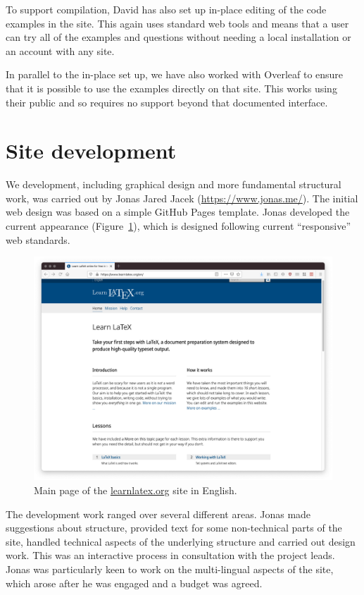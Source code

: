 \documentclass[a4paper]{article}
\begin{document}
To support compilation, David has also set up in-place editing of the code
examples in the site. This again uses standard web tools and means that a user
can try all of the examples and questions without needing a local installation
or an account with any site.

In parallel to the in-place set up, we have also worked with Overleaf to ensure
that it is possible to use the examples directly on that site. This works using
their public  and so requires no support beyond that documented
interface.

\section{Site development}

We development, including graphical design and more fundamental structural
work, was carried out by Jonas Jared Jacek (\url{https://www.jonas.me/}). The
initial web design was based on a simple GitHub Pages template. Jonas developed
the current appearance (Figure~\ref{fgr:site}), which is designed following
current \enquote{responsive} web standards.
\begin{figure}
  \includegraphics[width = \textwidth]{learnlatex-screenshot}
  \caption{Main page of the \url{learnlatex.org} site in English.\label{fgr:site}}
\end{figure}

The development work ranged over several different areas. Jonas made
suggestions about structure, provided text for some non-technical parts of the
site, handled technical aspects of the underlying structure and carried out
design work. This was an interactive process in consultation with the project
leads. Jonas was particularly keen to work on the multi-lingual aspects of
the site, which arose after he was engaged and a budget was agreed.
\end{document}
